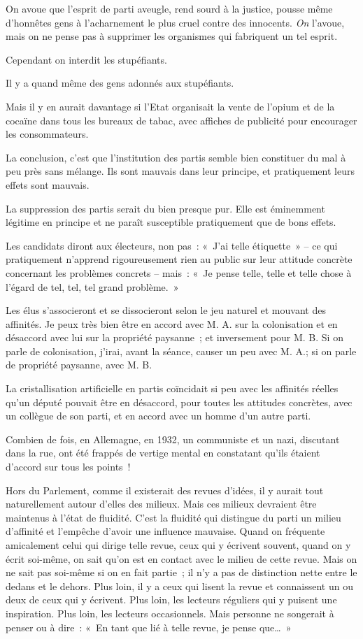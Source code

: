 \documentclass[french,twoside]{book} %
\begin{document}
On avoue que l’esprit de parti aveugle, rend sourd à la justice, pousse même d’honnêtes gens à l’acharnement le plus cruel contre des innocents. \emph{On} l’avoue, mais on ne pense pas à supprimer les organismes qui fabriquent un tel esprit.\par
Cependant on interdit les stupéfiants.\par
Il y a quand même des gens adonnés aux stupéfiants.\par
Mais il y en aurait davantage si l’Etat organisait la vente de l’opium et de la cocaïne dans tous les bureaux de tabac, avec affiches de publicité pour encourager les consommateurs.\par
La conclusion, c’est que l’institution des partis semble bien constituer du mal à peu près sans mélange. Ils sont mauvais dans leur principe, et pratiquement leurs effets sont mauvais.\par
La suppression des partis serait du bien presque pur. Elle est éminemment légitime en principe et ne paraît susceptible pratiquement que de bons effets.\par
Les candidats diront aux électeurs, non pas : « J’ai telle étiquette » – ce qui pratiquement n’apprend rigoureusement rien au public sur leur attitude concrète concernant les problèmes concrets – mais : « Je pense telle, telle et telle chose à l’égard de tel, tel, tel grand problème. »\par
Les élus s’associeront et se dissocieront selon le jeu naturel et mouvant des affinités. Je peux très bien être en accord avec M. A. sur la colonisation et en désaccord avec lui sur la propriété paysanne ; et inversement pour M. B. Si on parle de colonisation, j’irai, avant la séance, causer un peu avec M. A.; si on parle de propriété paysanne, avec M. B.\par
La cristallisation artificielle en partis coïncidait si peu avec les affinités réelles qu’un député pouvait être en désaccord, pour toutes les attitudes concrètes, avec un collègue de son parti, et en accord avec un homme d’un autre parti.\par
Combien de fois, en Allemagne, en 1932, un communiste et un nazi, discutant dans la rue, ont été frappés de vertige mental en constatant qu’ils étaient d’accord sur tous les points !\par
Hors du Parlement, comme il existerait des revues d’idées, il y aurait tout naturellement autour d’elles des milieux. Mais ces milieux devraient être maintenus à l’état de fluidité. C’est la fluidité qui distingue du parti un milieu d’affinité et l’empêche d’avoir une influence mauvaise. Quand on fréquente amicalement celui qui dirige telle revue, ceux qui y écrivent souvent, quand on y écrit soi-même, on sait qu’on est en contact avec le milieu de cette revue. Mais on ne sait pas soi-même si on en fait partie ; il n’y a pas de distinction nette entre le dedans et le dehors. Plus loin, il y a ceux qui lisent la revue et connaissent un ou deux de ceux qui y écrivent. Plus loin, les lecteurs réguliers qui y puisent une inspiration. Plus loin, les lecteurs occasionnels. Mais personne ne songerait à penser ou à dire : « En tant que lié à telle revue, je pense que… »\par
\end{document}
